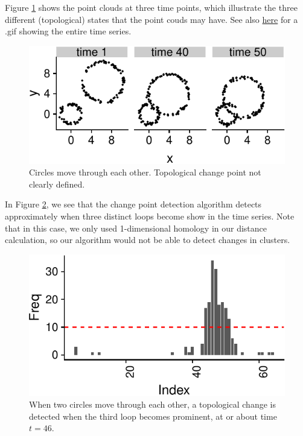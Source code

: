 \documentclass[smallextended]{svjour3}       %
\begin{document}
\begin{example}
Figure \ref{fig:7} shows the point clouds at three time points, which illustrate the three different (topological) states that the point couds may have. See also \href{http://stat.slu.edu/~speegle/Circles2.gif}{here} for a .gif showing the entire time series.

\begin{figure}\includegraphics{springer_template_files/figure-latex/chunk_7-1} 
\caption{Circles move through each other. Topological change point not clearly defined.}
\label{fig:7}\end{figure}

In Figure \ref{fig:8}, we see that the change point detection algorithm detects approximately
when three distinct loops become show in the time series. Note that in this case, we only
used 1-dimensional homology in our distance calculation, so our algorithm would not be able to detect changes
in clusters. 

\begin{figure}[H]\includegraphics{springer_template_files/figure-latex/chunk_7_5-1} 
\caption{When two circles move through each other, a topological change is detected when the third loop becomes prominent, at or about time $t = 46$.}
\label{fig:8}\end{figure}


\end{example}
\end{document}
